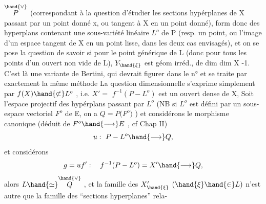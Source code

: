 
$\overset{\hand{\vee}}{P}$ (correspondant à la question d'étudier les sections hypérplanes de X
passant par un point donné x, ou tangent à X en un point  donné),
form donc des hyperplans contenant une sous-variété linéaire $L^{o}$ de P
(resp. un point,  ou l'image d'un espace tangent de X en un point lisse,
dans les deux cas envisagés), et on se pose la question de savoir si
pour le point générique \hand{$\xi$} de L  (donc pour tous les points d'un ouvert
non vide de L),  $Y_{\hand{\xi}}$  est  géom irréd., de
dim  dim X -1.   C'est là une variante  de Bertini, qui devrait figurer
dans  le n°  et se traite par exactement la même méthode  La question
dimensionnelle s'exprime simplement par  $f(X)\hand{\not\subset} L^{o}$ , 
i.e.  $X' =$  $f^{-1}(P - L^{o})$   est un ouvert dense de X, 
Soit  l'espace projectif des hypérplans passant par $L^{o}$  (NB si  $L^{o}$ est
défini par un sous-espace vectoriel $F^{o}$ de E,  on a   $Q = P($$F^{o})$ ) et
considérons le morphisme  canonique  (déduit de  $F^{o}\hand{\longrightarrow} E$ , cf
Chap II)
\[ u :\ P - L^{o} \hand{\longrightarrow} Q, \]
et considérons
\[ g = u f' :\quad f^{-1}(P - L^{o}) = X' \hand{\longrightarrow} Q , \]
alors   $L \hand{\simeq} \overset{\hand{\vee}}{Q}$ ,  et la famille des
$X'_{\hand{\xi}}$  $(\hand{\xi}\hand{\in} L)$  n'est autre que la famille des ``sections hyperplanes'' rela-%

